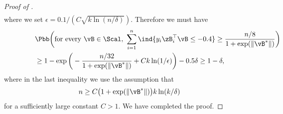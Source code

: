 \documentclass[11pt]{article}
\begin{document}
\begin{proof}[Proof of ]
\begin{align*}
\end{align*}
where we set $\epsilon = 0.1/( C \sqrt{k\ln(n/\delta)})$.
Therefore we must have 
\begin{align*}
&\lefteqn{ \Pbb\bigg(    \text{for every $\vB\in\Scal$},\ \sum_{i=1}^n \ind{y_i\zB_i^\top \vB \le -0.4} \ge  \frac{n/8}{1+\exp(\|\vB^*\|)}\bigg)  } \\
& \ge 1- \exp\bigg(- \frac{n/32}{1+\exp(\|\vB^*\|)} + C k \ln(1/\epsilon)\bigg) - 0.5 \delta
\ge 1- \delta,
\end{align*}
where in the last inequality we use the assumption that 
\begin{align*}
    n \ge C \big( 1+ \exp(\|\vB^*\|) \big)  k  \ln(k /\delta)
\end{align*}
for a sufficiently large constant $C>1$. We have completed the proof.
\end{proof}
\end{document}
